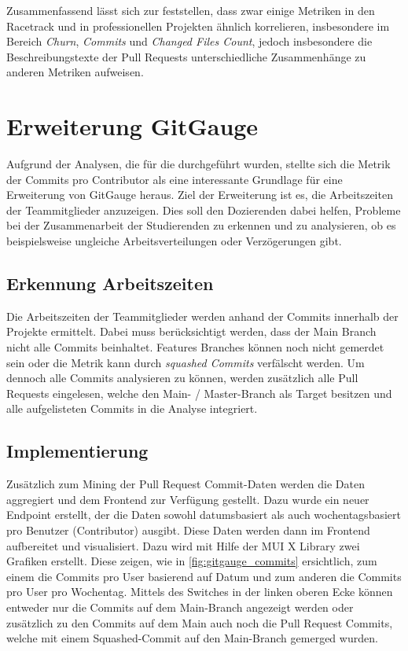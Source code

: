 Zusammenfassend lässt sich zur  feststellen, dass zwar einige Metriken in den Racetrack und  in professionellen Projekten ähnlich korrelieren, insbesondere im Bereich \textit{Churn}, \textit{Commits} und \textit{Changed Files Count}, jedoch insbesondere die Beschreibungstexte der Pull Requests unterschiedliche Zusammenhänge zu anderen Metriken aufweisen.

\newpage



\section{Erweiterung GitGauge}
Aufgrund der Analysen, die für die  durchgeführt wurden, stellte sich die Metrik der Commits pro Contributor als eine interessante Grundlage für eine Erweiterung von GitGauge heraus. 
Ziel der Erweiterung ist es, die Arbeitszeiten der Teammitglieder anzuzeigen. Dies soll den Dozierenden dabei helfen, Probleme bei der Zusammenarbeit der Studierenden zu erkennen und zu analysieren, ob es beispielsweise ungleiche Arbeitsverteilungen oder Verzögerungen gibt.

\subsection{Erkennung Arbeitszeiten}
Die Arbeitszeiten der Teammitglieder werden anhand der Commits innerhalb der Projekte ermittelt. Dabei muss berücksichtigt werden, dass der Main Branch nicht alle Commits beinhaltet. Features Branches können noch nicht gemerdet sein oder die Metrik kann durch \textit{squashed Commits} verfälscht werden. Um dennoch alle Commits analysieren zu können, werden zusätzlich alle Pull Requests eingelesen, welche den Main- / Master-Branch als Target besitzen und alle aufgelisteten Commits in die Analyse integriert. 

\subsection{Implementierung}
Zusätzlich zum Mining der Pull Request Commit-Daten werden die Daten aggregiert und dem Frontend zur Verfügung gestellt. Dazu wurde ein neuer Endpoint erstellt, der die Daten sowohl datumsbasiert als auch wochentagsbasiert pro Benutzer (Contributor) ausgibt. Diese Daten werden dann im Frontend aufbereitet und visualisiert. Dazu wird mit Hilfe der MUI X Library zwei Grafiken erstellt. Diese zeigen, wie in \autoref{fig:gitgauge_commits} ersichtlich, zum einem die Commits pro User basierend auf Datum und zum anderen die Commits pro User pro Wochentag. Mittels des Switches in der linken oberen Ecke können entweder nur die Commits auf dem Main-Branch angezeigt werden oder zusätzlich zu den Commits auf dem Main auch noch die Pull Request Commits, welche mit einem Squashed-Commit auf den Main-Branch gemerged wurden.

